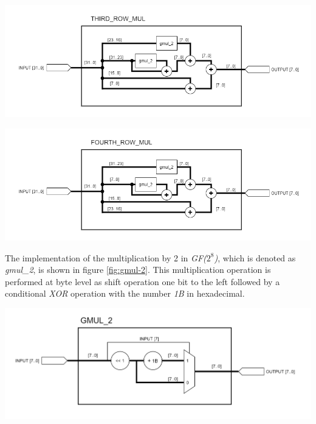 \documentclass[a4paper, 10pt]{article}
\newenvironment{Figure}
    {\par\medskip\noindent\minipage{\linewidth}}
    {\endminipage\par\medskip}
\begin{document}
\begin{multicols}{2}
            \noindent
            \begin{Figure}
                \centering
                \includegraphics[width=\linewidth]{Third_Row_Mul.png}
                \label{fig:third-row-mul}
            \end{Figure}

            \noindent
            \begin{Figure}
                \centering
                \includegraphics[width=\linewidth]{Fourth_Row_Mul.png}
                \label{fig:fourth-row-mul}
            \end{Figure}

            The implementation of the multiplication by 2 in \textit{GF($2^{8}$)}, which is denoted as \textit{gmul\_2}, is shown in figure \ref{fig:gmul-2}. This multiplication operation is performed at byte level as shift operation one bit to the left followed by a conditional \textit{XOR} operation with the number \textit{1B} in hexadecimal.

            \noindent
            \begin{Figure}
                \centering
                \includegraphics[width=\linewidth]{gmul_2.png}
                \label{fig:gmul-2}
            \end{Figure}


\end{multicols}
\end{document}
